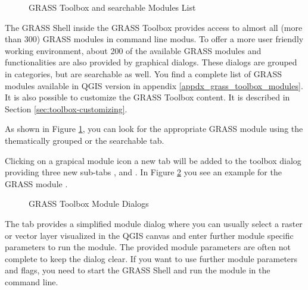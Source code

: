 \begin{figure}[h]
\centering
\caption{GRASS Toolbox and searchable Modules List \nixcaption}\label{fig:grass_modules}
   \goodgap
\end{figure}

The GRASS Shell inside the GRASS Toolbox provides access to almost all (more 
than 300) GRASS modules in command line modus. To offer a more user
friendly working environment, about 200 of the available GRASS modules and 
functionalities are also provided by graphical dialogs. These dialogs are 
grouped in categories, but are searchable as well. You find a complete 
list of GRASS modules available in QGIS version \CURRENT
in appendix \ref{appdx_grass_toolbox_modules}. It is also possible to 
customize the GRASS Toolbox content. It is described in Section 
\ref{sec:toolbox-customizing}.

As shown in Figure \ref{fig:grass_modules}, you can look for the appropriate 
GRASS module using the thematically grouped  or the 
searchable  tab. 

Clicking on a grapical module icon a new tab will be added to the toolbox 
dialog providing three new sub-tabs ,  and 
. In Figure \ref{fig:grass_module_dialog} you see an example 
for the GRASS module .

\begin{figure}[h]
\centering
\caption{GRASS Toolbox Module Dialogs \nixcaption}\label{fig:grass_module_dialog}
   \goodgap
   \goodgap
\end{figure}


The  tab provides a simplified module dialog where you can 
usually select a raster or vector layer visualized in the QGIS canvas and 
enter further module specific parameters to run the module. The provided 
module parameters are often not complete to keep the dialog clear. If you want 
to use further module parameters and flags, you need to start the GRASS Shell 
and run the module in the command line.

